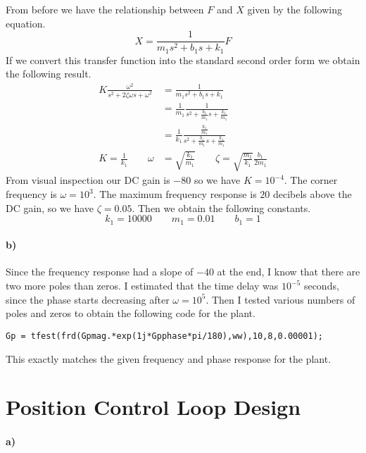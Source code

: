 \documentclass[12pt]{article}
\begin{document}
From before we have the relationship between \(F\) and \(X\) given by the following equation.
\[X=\frac{1}{m_1s^2 + b_1s + k_1}F\]
If we convert this transfer function into the standard second order form we obtain the following result.
\begin{align*}
    K\frac{\omega^2}{s^2+2\zeta\omega s + \omega^2}&=\frac{1}{m_1s^2 + b_1s + k_1}\\
    &=\frac{1}{m_1}\frac{1}{s^2 + \frac{b_1}{m_1}s + \frac{k_1}{m_1}}\\
    &=\frac{1}{k_1}\frac{\frac{k_1}{m_1}}{s^2 + \frac{b_1}{m_1}s + \frac{k_1}{m_1}}\\
    K=\frac{1}{k_1}\qquad \omega&=\sqrt{\frac{k_1}{m_1}}\qquad\zeta=\sqrt{\frac{m_1}{k_1}}\frac{b_1}{2m_1}
\end{align*}
From visual inspection our DC gain is \(-80\) so we have \(K=10^{-4}\). The corner frequency is \(\omega=10^3\).
The maximum frequency response is \(20\) decibels above the DC gain, so we have \(\zeta=0.05\). Then we obtain
the following constants.
\[k_1=10000 \qquad m_1=0.01 \qquad b_1=1\]

\paragraph{b)}

Since the frequency response had a slope of \(-40\) at the end, I know that there are two more poles than zeros.
I estimated that the time delay was \(10^{-5}\) seconds, since the phase starts decreasing after \(\omega=10^5\).
Then I tested various numbers of poles and zeros to obtain the following code for the plant.
\begin{verbatim}
Gp = tfest(frd(Gpmag.*exp(1j*Gpphase*pi/180),ww),10,8,0.00001);
\end{verbatim}
This exactly matches the given frequency and phase response for the plant.

\section{Position Control Loop Design}

\paragraph{a)}
\end{document}

